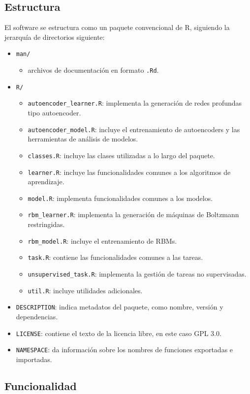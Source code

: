 \subsection{Estructura}

El software se estructura como un paquete convencional de R, siguiendo la jerarquía de directorios siguiente:
\begin{itemize}
\item \texttt{man/}
  \begin{itemize}
  \item archivos de documentación en formato \texttt{.Rd}.
  \end{itemize}
\item \texttt{R/}
  \begin{itemize}
  \item \texttt{autoencoder\_learner.R}: implementa la generación de redes profundas tipo autoencoder.
  \item \texttt{autoencoder\_model.R}: incluye el entrenamiento de autoencoders y las herramientas de análisis de modelos.
  \item \texttt{classes.R}: incluye las clases utilizadas a lo largo del paquete.
  \item \texttt{learner.R}: incluye las funcionalidades comunes a los algoritmos de aprendizaje.
  \item \texttt{model.R}: implementa funcionalidades comunes a los modelos.
  \item \texttt{rbm\_learner.R}: implementa la generación de máquinas de Boltzmann restringidas.
  \item \texttt{rbm\_model.R}: incluye el entrenamiento de RBMs.
  \item \texttt{task.R}:  contiene las funcionalidades comunes a las tareas.
  \item \texttt{unsupervised\_task.R}: implementa la gestión de tareas no supervisadas. 
  \item \texttt{util.R}: incluye utilidades adicionales.
  \end{itemize}
\item \texttt{DESCRIPTION}: indica metadatos del paquete, como nombre, versión y dependencias.
\item \texttt{LICENSE}: contiene el texto de la licencia libre, en este caso GPL 3.0.
\item \texttt{NAMESPACE}: da información sobre los nombres de funciones exportadas e importadas.
\end{itemize}

\subsection{Funcionalidad}

